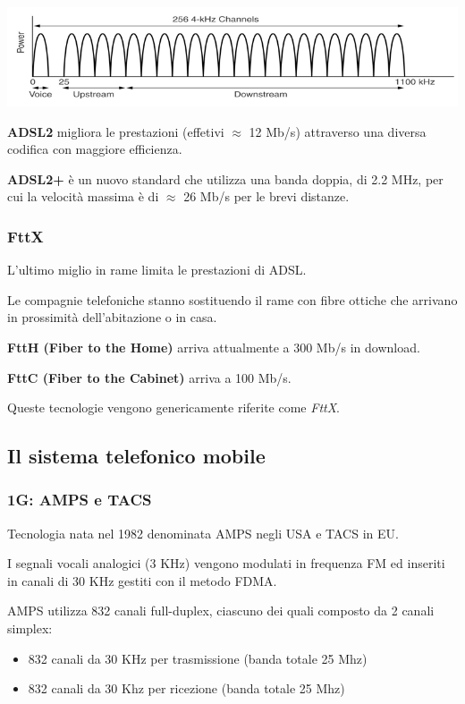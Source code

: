         \begin{center}
            \includegraphics[scale=0.427]{chapters/2/assets/schema_f.png}
        \end{center}

        \textbf{ADSL2} migliora le prestazioni (effetivi $\approx$ 12 Mb/s) attraverso una diversa codifica con maggiore efficienza.

        \textbf{ADSL2+} è un nuovo standard che utilizza una banda doppia, di 2.2 MHz, per cui la velocità massima è di $\approx$ 26 Mb/s per le brevi distanze.

        \subsubsection{FttX}
            L'ultimo miglio in rame limita le prestazioni di ADSL.

            Le compagnie telefoniche stanno sostituendo il rame con fibre ottiche che arrivano in prossimità dell'abitazione o in casa.

            \textbf{FttH (Fiber to the Home)} arriva attualmente a 300 Mb/s in download.

            \textbf{FttC (Fiber to the Cabinet)} arriva a 100 Mb/s.

            Queste tecnologie vengono genericamente riferite come \textit{FttX}.

    \subsection{Il sistema telefonico mobile}
        \subsubsection{1G: AMPS e TACS}
            Tecnologia nata nel 1982 denominata AMPS negli USA e TACS in EU.
        
            I segnali vocali analogici (3 KHz) vengono modulati in frequenza FM ed inseriti in canali di 30 KHz gestiti con il metodo FDMA.

            AMPS utilizza 832 canali full-duplex, ciascuno dei quali composto da 2 canali simplex:
            \begin{itemize}
                \item 832 canali da 30 KHz per trasmissione (banda totale 25 Mhz)
                \item 832 canali da 30 Khz per ricezione (banda totale 25 Mhz)
            \end{itemize}

